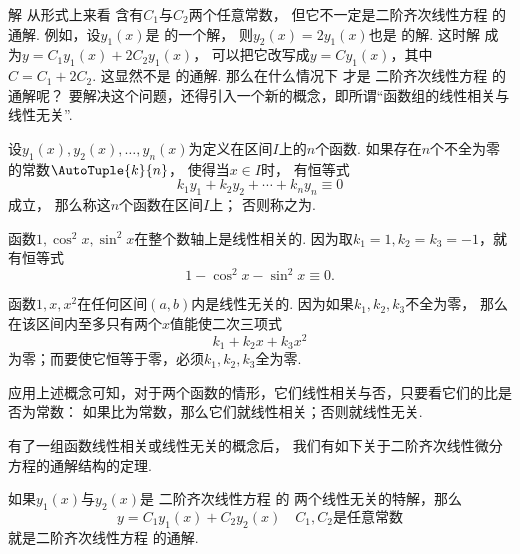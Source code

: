 解  从形式上来看
含有\(C_1\)与\(C_2\)两个任意常数，
但它不一定是二阶齐次线性方程  的通解.
例如，设\(y_1(x)\)是  的一个解，
则\(y_2(x)=2 y_1(x)\)也是  的解.
这时解  成为\(y = C_1 y_1(x) + 2 C_2 y_1(x)\)，
可以把它改写成\(y = C y_1(x)\)，其中\(C = C_1 + 2 C_2\).
这显然不是  的通解.
那么在什么情况下  才是%
二阶齐次线性方程  的通解呢？
要解决这个问题，还得引入一个新的概念，即所谓“函数组的线性相关与线性无关”.

\begin{definition}
设\(y_1(x),y_2(x),\dotsc,y_n(x)\)为定义在区间\(I\)上的\(n\)个函数.
如果存在\(n\)个不全为零的常数\(\AutoTuple{k}{n}\)，
使得当\(x \in I\)时，
有恒等式\[
	k_1 y_1+k_2 y_2+ \dotsb +k_n y_n \equiv 0
\]成立，
那么称这\(n\)个函数在区间\(I\)上；
否则称之为.
\end{definition}

\begin{example}
函数\(1,\cos^2 x, \sin^2 x\)在整个数轴上是线性相关的.
因为取\(k_1=1,k_2=k_3=-1\)，就有恒等式\[
	1 - \cos^2 x - \sin^2 x \equiv 0.
\]

函数\(1,x,x^2\)在任何区间\((a,b)\)内是线性无关的.
因为如果\(k_1,k_2,k_3\)不全为零，
那么在该区间内至多只有两个\(x\)值能使二次三项式\[
	k_1 + k_2 x + k_3 x^2
\]为零；而要使它恒等于零，必须\(k_1,k_2,k_3\)全为零.
\end{example}

应用上述概念可知，对于两个函数的情形，它们线性相关与否，只要看它们的比是否为常数：
如果比为常数，那么它们就线性相关；否则就线性无关.

有了一组函数线性相关或线性无关的概念后，
我们有如下关于二阶齐次线性微分方程的通解结构的定理.
\begin{theorem}\label{theorem:微分方程.二阶齐次线性微分方程的通解结构}
如果\(y_1(x)\)与\(y_2(x)\)是
二阶齐次线性方程  的
两个线性无关的特解，那么\[
	y = C_1 y_1(x) + C_2 y_2(x)
	\quad\text{\(C_1,C_2\)是任意常数}
\]
就是二阶齐次线性方程  的通解.
\end{theorem}

